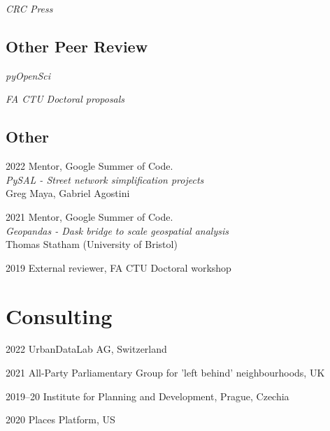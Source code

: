 \documentclass[12pt,a4paper]{report}
\newcommand{\listitemspace}{0.25em}
\renewenvironment{itemize}
{\begin{list}{}{\setlength{\leftmargin}{0em}
                \setlength{\parskip}{0em}
                \setlength{\itemsep}{\listitemspace}
                \setlength{\parsep}{\listitemspace}}}
{\end{list}}
\begin{document}
    \begin{itemize}

        \item \textit{CRC Press}

    \end{itemize}

    \subsection*{Other Peer Review}

    \begin{itemize}

        \item \textit{pyOpenSci}
        \item \textit{FA CTU Doctoral proposals}

    \end{itemize}

    \subsection*{Other}

    \begin{tablist}

        \item[2022] \tab{}Mentor, Google Summer of Code. \\
                          \textit{PySAL - Street network simplification projects} \\
                          Greg Maya, Gabriel Agostini

        \item[2021] \tab{}Mentor, Google Summer of Code. \\
                          \textit{Geopandas - Dask bridge to scale geospatial analysis} \\
                          Thomas Statham (University of Bristol)

        \item[2019] \tab{}External reviewer, FA CTU Doctoral workshop

    \end{tablist}

    \section*{Consulting}

    \begin{tablist}

        \item[2022] \tab{}UrbanDataLab AG, Switzerland
        \item[2021] \tab{}All-Party Parliamentary Group for 'left behind' neighbourhoods, UK
        \item[2019--20] \tab{}Institute for Planning and Development, Prague, Czechia
        \item[2020] \tab{}Places Platform, US

    \end{tablist}
\end{document}
